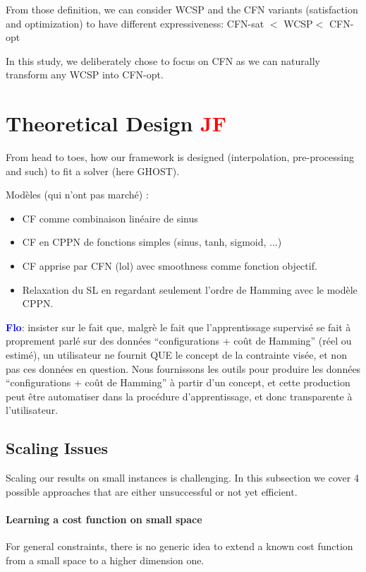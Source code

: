 \documentclass{article}
\newcommand{\cfn}{\textsc{CFN}\xspace}
\newcommand{\wcsp}{\textsc{WCSP}\xspace}
\newcommand{\flo}{\textcolor{blue}{\bf Flo}\xspace}
\newcommand{\jf}{\textcolor{red}{\bf JF}\xspace}
\begin{document}
From those  definition, we  can consider \wcsp  and the  \cfn variants
(satisfaction  and  optimization)  to have  different  expressiveness:
\cfn-sat $<$ \wcsp $<$ \cfn-opt

In  this study,  we deliberately  chose  to focus  on \cfn  as we  can
naturally transform any \wcsp into \cfn-opt.

\section{Theoretical Design \jf}\label{sec:theory}
From  head to  toes,  how our  framework  is designed  (interpolation,
pre-processing and such) to fit a solver (here GHOST).

Modèles (qui n'ont pas marché) :
\begin{itemize}
\item CF comme combinaison linéaire de sinus
\item CF en CPPN de fonctions simples (sinus, tanh, sigmoid, ...)
\item CF apprise par CFN (lol) avec smoothness comme fonction objectif.
\item Relaxation du SL en regardant seulement l'ordre de Hamming avec le modèle CPPN.
\end{itemize}

\flo: insister  sur le  fait que, malgrè  le fait  que l'apprentissage
supervisé se fait à proprement  parlé sur des données ``configurations
+ coût de Hamming'' (réel ou estimé), un utilisateur ne fournit QUE le
concept  de   la  contrainte  visée,   et  non  pas  ces   données  en
question.  Nous  fournissons  les  outils pour  produire  les  données
``configurations + coût  de Hamming'' à partir d'un  concept, et cette
production peut être automatiser dans la procédure d'apprentissage, et
donc transparente à l'utilisateur.

\subsection{Scaling Issues}\label{subsec:issues}
Scaling  our  results  on  small instances  is  challenging.  In  this
subsection we cover 4 possible approaches that are either unsuccessful
or not yet efficient.

\paragraph{Learning a cost function on small space}
For general constraints, there is no generic idea to extend a known cost
function from a small space to a higher dimension one.
\end{document}
